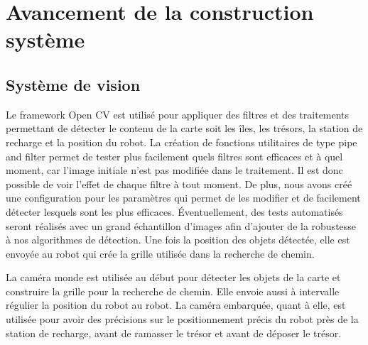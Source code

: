 \chapter{Avancement de la construction système}

\section{Système de vision}

Le framework Open CV est utilisé pour appliquer des filtres et des traitements permettant de détecter le contenu de la carte soit 
les îles, les trésors, la station de recharge et la position du robot. La création de fonctions utilitaires de type pipe and filter 
permet de tester plus facilement quels filtres sont efficaces et à quel moment, car l'image initiale n'est pas modifiée dans le 
traitement. Il est donc possible de voir l'effet de chaque filtre à tout moment. De plus, nous avons créé une configuration 
pour les paramètres qui permet de les modifier et de facilement détecter lesquels sont les plus efficaces. Éventuellement, des
tests automatisés seront réalisés avec un grand échantillon d'images afin d'ajouter de la robustesse à nos algorithmes de détection.
Une fois la position des objets détectée, elle est envoyée au robot qui crée la grille utilisée dans la recherche de chemin.


La caméra monde est utilisée au début pour détecter les objets de la carte et construire la grille pour la recherche de chemin. Elle envoie aussi à intervalle régulier la position du robot au robot. La caméra embarquée, quant à elle, est utilisée pour avoir des précisions sur le positionnement précis du robot près de la station de recharge, avant de ramasser le trésor et avant de déposer le trésor.